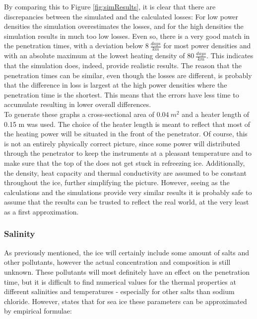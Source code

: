 \noindent
By comparing this to Figure \ref{fig:simResults}, it is clear that there are discrepancies between the simulated and the calculated losses: For low power densities the simulation overestimates the losses, and for the high densities the simulation results in much too low losses. Even so, there is a very good match in the penetration times, with a deviation below $\SI{8}{\frac{days}{km}}$ for most power densities and with an absolute maximum at the lowest heating density of  $\SI{80}{\frac{days}{km}}$. This indicates that the simulation does, indeed, provide realistic results. The reason that the penetration times can be similar, even though the losses are different, is probably that the difference in loss is largest at the high power densities where the penetration time is the shortest. This means that the errors have less time to accumulate resulting in lower overall differences.\\

\noindent
To generate these graphs a cross-sectional area of $\SI{0.04}{m^2}$ and a heater length of 0.15 m was used. The choice of the heater length is meant to reflect that most of the heating power will be situated in the front of the penetrator. Of course, this is not an entirely physically correct picture, since some power will distributed through the penetrator to keep the instruments at a pleasant temperature and to make sure that the top of the does not get stuck in refreezing ice. Additionally, the density, heat capacity and thermal conductivity are assumed to be constant throughout the ice, further simplifying the picture. However, seeing as the calculations and the simulations provide very similar results it is probably safe to assume that the results can be trusted to reflect the real world, at the very least as a first approximation.\\

\subsubsection{Salinity} \label{sec:iceSalinity}
As previously mentioned, the ice will certainly include some amount of salts and other pollutants, however the actual concentration and composition is still unknown. These pollutants will most definitely have an effect on the penetration time, but it is difficult to find numerical values for the thermal properties at different salinities and temperatures - especially for other salts than sodium chloride. However, \citet{book:thomas2009sea} states that for sea ice these parameters can be approximated by empirical formulae:\\

